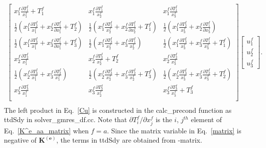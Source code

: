 \begin{eqnarray}
%
\begin{bmatrix}
x_1^f \frac{\partial T_1^f}{x_1^f} + T_1^f & x_1^f \frac{\partial T_1^f}{x_2^f} & x_1^f \frac{\partial T_1^f}{x_3^f} \\
%
\frac{1}{2} \left( x_1^f \frac{\partial T_2^f}{x_1^f} + x_2^f \frac{\partial T_1^f}{\partial x_1^f} + T_2^f \right) & \frac{1}{2} \left( x_1^f \frac{\partial T_2^f}{x_2^f} + x_2^f \frac{\partial T_1^f}{\partial x_2^f} + T_1^f \right) & \frac{1}{2} \left( x_1^f \frac{\partial T_2^f}{x_3^f} + x_2^f \frac{\partial T_1^f}{\partial x_3^f} \right) \\
%
\frac{1}{2} \left( x_1^f \frac{\partial T_3^f}{x_1^f} + x_3^f \frac{\partial T_1^f}{\partial x_1^f}  +T_3^f \right) & \frac{1}{2} \left(x_1^f \frac{\partial T_3^f}{x_2^f} + x_3^f \frac{\partial T_1^f}{x_2^f} \right) & \frac{1}{2} \left( x_1^f \frac{\partial T_3^f}{x_3^f} + x_3^f \frac{\partial T_1^f}{x_3^f} + T_1^f \right)\\
%
x_2^f \frac{\partial T_2^f}{x_1^f} & x_2^f \frac{\partial T_2^f}{x_2^f} + T_2^f & x_2^f \frac{\partial T_2^f}{x_3^f} \\
%
\frac{1}{2} \left( x_2^f \frac{\partial T_3^f}{x_1^f} + x_3^f \frac{\partial T_2^f}{x_1^f} \right)& \frac{1}{2} \left( x_2^f \frac{\partial T_3^f}{x_2^f} + x_3^f \frac{\partial T_2^f}{x_2^f} + T_3^f \right) & \frac{1}{2} \left(x_2^f \frac{\partial T_3^f}{x_3^f} + x_3^f \frac{\partial T_2^f}{x_3^f} + T_2^f \right)\\
%
x_3^f \frac{\partial T_3^f}{x_1^f} & x_3^f \frac{\partial T_3^f}{x_2^f} & x_3^f \frac{\partial T_3^f}{x_3^f} + T_3^f \\
\end{bmatrix}
%
\begin{bmatrix}
u_1^f \\ u_2^f \\ u_3^f 
\end{bmatrix}. \nonumber\\ 
%
\label{Cu}
\end{eqnarray}
%
The left product in Eq.\ \eqref{Cu} is constructed in the calc\_precond function as ttdSdy in solver\_gmres\_df.cc. Note that $\partial T_i^f/\partial x_j^f$ is the $i$, $j^{th}$ element of Eq.\ \eqref{K^e_aa_matrix} when $f=a$. Since the matrix variable in Eq.\ \eqref{matrix} is negative of $\textbf{K}^{(\textbf{e})}$, the terms in ttdSdy are obtained from -matrix.  

